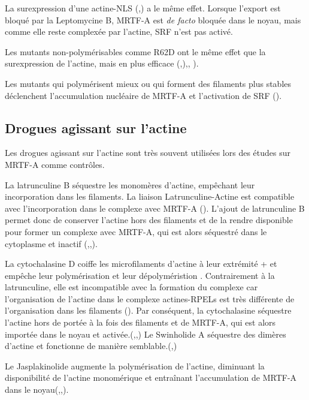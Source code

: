 \documentclass{report}
\begin{document}
La surexpression d'une actine-NLS (\cite{vartiainen_nuclear_2007},\cite{posern_mutant_2002}) a le même effet. Lorsque l'export est bloqué par la Leptomycine B, MRTF-A est \emph{de facto} bloquée dans le noyau, mais comme elle reste complexée par l'actine, SRF n'est pas activé. 

Les mutants non-polymérisables comme R62D ont le même effet que la surexpression de l'actine, mais en plus efficace (\cite{posern_mutant_2002},\cite{miralles_actin_2003}),\cite{vartiainen_nuclear_2007}, \cite{collard_nuclear_2014}). 

Les mutants qui polymérisent mieux ou qui forment des filaments plus stables déclenchent l'accumulation nucléaire de MRTF-A et l'activation de SRF (\cite{posern_mutant_2004}). 


\subsection{Drogues agissant sur l'actine}

Les drogues agissant sur l'actine sont très souvent utilisées lors des études sur MRTF-A comme contrôles. 

La latrunculine B séquestre les monomères d'actine, empêchant leur incorporation dans les filaments. La liaison Latrunculine-Actine est compatible avec l'incorporation dans le complexe avec MRTF-A (\cite{mouilleron_molecular_2008}). 
L'ajout de latrunculine B permet donc de conserver l'actine hors des filaments et de la rendre disponible pour former un complexe avec MRTF-A, qui est alors séquestré dans le cytoplasme et inactif (\cite{vartiainen_nuclear_2007},\cite{zhao_force_2007},\cite{smith_induction_2013}). 

La cytochalasine D coiffe les microfilaments d'actine à leur extrémité + et empêche leur polymérisation et leur dépolyméristion . 
Contrairement à la latrunculine, elle est incompatible avec la formation du complexe car l'organisation de l'actine dans le complexe actines-RPELs est très différente de l'organisation dans les filaments (\cite{treisman_structure_2011}). 
Par conséquent, la cytochalasine séquestre l'actine hors de portée à la fois des filaments et de MRTF-A, qui est alors importée dans le noyau et activée.(\cite{miralles_actin_2003},\cite{vartiainen_nuclear_2007},\cite{smith_induction_2013}) Le Swinholide A séquestre des dimères d'actine et fonctionne de manière semblable.(\cite{miralles_actin_2003},\cite{vartiainen_nuclear_2007})

Le Jasplakinolide augmente la polymérisation de l'actine, diminuant la disponibilité de l'actine monomérique et entraînant l'accumulation de MRTF-A dans le noyau(\cite{miralles_actin_2003},\cite{vartiainen_nuclear_2007},\cite{smith_induction_2013}). 
\end{document}
